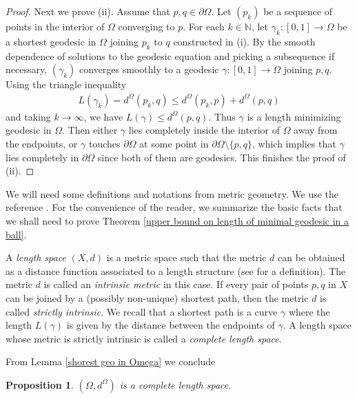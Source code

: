 \documentclass[12pt]{amsart}
\numberwithin{equation}{section}
\newtheorem{prop}[thm]{Proposition}
\theoremstyle{remark}
\begin{document}
\begin{proof}
		Next we prove (ii). Assume that $p, q\in \partial \Omega$. Let $(p_k)$ be a sequence of points in the interior of $\Omega$ converging to $p$. For each $k\in \mathbb N$, let $\gamma_k : [0,1]\to \Omega$ be a shortest geodesic in $\Omega$ joining $p_k$ to $q$ constructed in (i). By the smooth dependence of solutions to the geodesic equation and picking a subsequence if necessary, $(\gamma_k)$ converges smoothly to a geodesic $\gamma : [0,1]\to \Omega$ joining $p, q$. Using the triangle inequality
		\begin{align*}
			L(\gamma_k) = d^\Omega(p_k, q) \le d^\Omega (p_k, p) + d^\Omega(p, q)
		\end{align*}
		and taking $k\to \infty$, we have $L(\gamma) \le d^\Omega(p, q)$. Thus $\gamma$ is a length minimizing geodesic in $\Omega$. Then either $\gamma$ lies completely inside the interior of $\Omega$ away from the endpoints, or $\gamma$ touches $\partial \Omega$ at some point in $\partial\Omega\setminus \{p,q\}$, which implies that $\gamma$ lies completely in $\partial \Omega$ since both of them are geodesics. This finishes the proof of (ii). 
	\end{proof}
	
	We will need some definitions and notations from metric geometry. We use the reference \cite{BBI}. For the convenience of the reader, we summarize the basic facts that we shall need to prove Theorem \ref{upper bound on length of minimal geodesic in a ball}.
	
	A {\sl length space} $(X,d)$ is a metric space such that the metric $d$ can be obtained as a distance function associated to a length structure (see \cite{BBI} for a definition). The metric $d$ is called an {\sl intrinsic metric} in this case. If every pair of points $p,q$ in $X$ can be joined by a (possibly non-unique) shortest path, then the metric $d$ is called {\sl strictly intrinsic}. We recall that a shortest path is a curve $\gamma$ where the length $L(\gamma)$ is given by the distance between the endpoints of $\gamma$. A length space whose metric is strictly intrinsic is called a {\sl complete length space}.
	
	
	
	From Lemma \ref{shorest geo in Omega} we conclude 
	
	\begin{prop} \label{omega, d^omega is complete intrinsic metric space}
		$(\Omega, d^\Omega)$ is a complete length space. 
	\end{prop}
	
\end{document}
